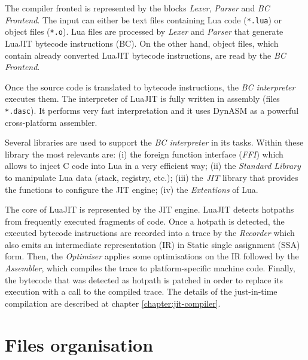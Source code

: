 \noindent
The compiler fronted is represented by the blocks \textit{Lexer}, \textit{Parser} and \textit{BC Frontend}. The input can either be text files containing Lua code (\texttt{*.lua}) or object files (\texttt{*.o}). Lua files are processed by \textit{Lexer} and \textit{Parser} that generate LuaJIT bytecode instructions (BC). On the other hand, object files, which contain already converted LuaJIT bytecode instructions, are read by the \textit{BC Frontend}. 

Once the source code is translated to bytecode instructions, the \textit{BC interpreter} executes them. The interpreter of LuaJIT is fully written in assembly (files \texttt{*.dasc}). It performs very fast interpretation and it uses DynASM \cite{pall2012dynasm} as a powerful cross-platform assembler. 

Several libraries are used to support the \textit{BC interpreter} in its tasks. Within these library the most relevants are: (i) the foreign function interface (\textit{FFI}) which allows to inject C code into Lua in a very efficient way; (ii) the \textit{Standard Library} to manipulate Lua data (stack, registry, etc.); (iii) the \textit{JIT} library that provides the functions to configure the JIT engine; (iv) the \textit{Extentions} of Lua.

The core of LuaJIT is represented by the JIT engine. LuaJIT detects hotpaths from frequently executed fragments of code. Once a hotpath is detected, the executed bytecode instructions are recorded into a trace by the \textit{Recorder} which also emits an intermediate representation (IR) in Static single assignment (SSA) form. Then, the \textit{Optimiser} applies some optimisations on the IR followed by the \textit{Assembler}, which compiles the trace to platform-specific machine code. Finally, the bytecode that was detected as hotpath is patched in order to replace its execution with a call to the compiled trace. The details of the just-in-time compilation are described at chapter \ref{chapter:jit-compiler}.

\section{Files organisation}


